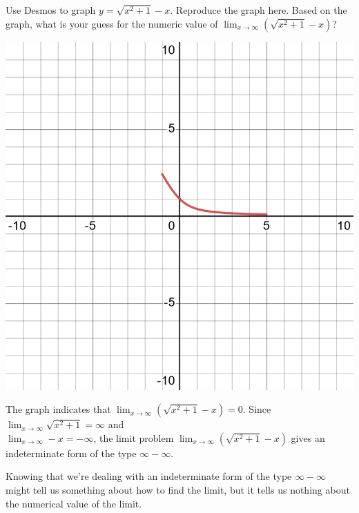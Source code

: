 \documentclass[12pt,fleqn]{exam}
\begin{document}
\begin{questions} 
    
  \question [2] Use Desmos to graph $y = \sqrt{x^2+1} - x$. Reproduce
  the graph here.  Based on the graph, what is your guess for 
  the numeric value of $\displaystyle \lim_{x \to \infty}
   \left( \sqrt{x^2+1} - x \right)$?


 
  \begin{solution}[2.5in]
  \vfill
 
    \begin{center}
        \includegraphics[scale=0.2]{desmos-graph(20).png}
    \end{center}
    The graph indicates that $\displaystyle \lim_{x \to \infty} 
    \left(\sqrt{x^2+1} - x \right) = 0$. Since 
    $\displaystyle \lim_{x \to \infty} \sqrt{x^2+1} = \infty$
  and \\ \mbox{$\displaystyle \lim_{x \to \infty}  - x = -\infty$}, 
  the limit problem $\displaystyle \lim_{x \to \infty} 
  \left(\sqrt{x^2+1} - x\right) $ gives
an indeterminate form of the type $\infty - \infty$.  

\quad  Knowing that we're dealing with an  indeterminate form of the type $\infty - \infty$ might
tell us something about how to find the limit, but it tells us nothing about the numerical value of the limit.
     \end{solution}


\end{questions}
\end{document}
